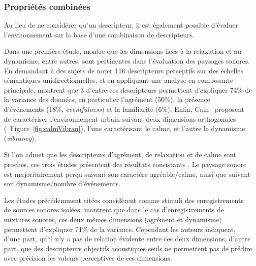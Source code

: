 \subsubsection{Propriétés combinées}

Au lieu de ne considérer qu'un descripteur, il est également possible d'évaluer l'environnement sur la base d'une combinaison de descripteurs.

Dans une première étude, \citep{kang2006urban} montre que les dimensions liées à la relaxation et au dynamisme, entre autres, sont pertinentes dans l'évaluation des paysages sonores. En demandant à des sujets de noter 116 descripteurs perceptifs sur des échelles sémantiques unidirectionnelles, et en appliquant une analyse en composante principale, \citep{axelsson2010principal} montrent que 3 d'entre ces descripteurs permettent d'expliquer 74\% de la variance des données, en particulier l'agrément (50\%), la présence d'événements (18\%, \emph{eventfulness}) et la familiarité (6\%). Enfin, Cain~\al \citep{cain2013development} proposent de caractériser l'environnement urbain suivant deux dimensions orthogonales (\cf~Figure~\ref{fig:calmVibran}), l'une caractérisant le calme, et l'autre le dynamisme (\emph{vibrancy}).

Si l'on admet que les descripteurs d'agrément, de relaxation et de calme sont proches, ces trois études présentent des résultats consistants \citep{davies2013perception}. Le paysage sonore est majoritairement perçu suivant son caractère agréable/calme, ainsi que suivant son dynamisme/nombre d'événements.
 
Les études précédemment citées considèrent comme stimuli des enregistrements de sources sonores isolées. \citep{hall2013exploratory} montrent que dans le cas d'enregistrements de mixtures sonores, ces deux mêmes dimensions (agrément et dynamisme) permettent d'expliquer 71\% de la variance. Cependant les auteurs indiquent, d'une part, qu'il n'y a pas de relation évidente entre ces deux dimensions, d'autre part, que des descripteurs objectifs acoustiques seuls ne permettent pas de prédire avec précision les valeurs perceptives de ces dimensions.
 
